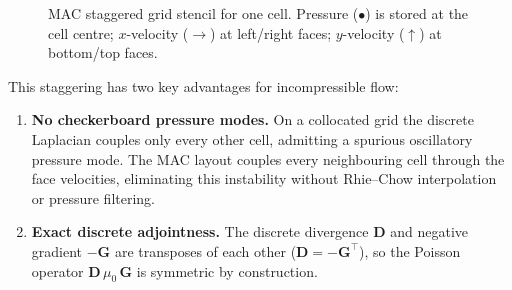 \documentclass[11pt]{article}
\newcommand{\vect}[1]{\bm{#1}}
\begin{document}
\begin{figure}[ht]
\centering
{}
\caption{MAC staggered grid stencil for one cell.
  Pressure (\textcolor{blue!80!black}{$\bullet$}) is stored at the cell
  centre; $x$-velocity (\textcolor{red!80!black}{$\to$}) at left/right
  faces; $y$-velocity (\textcolor{green!50!black}{$\uparrow$}) at
  bottom/top faces.}
\label{fig:mac}
\end{figure}

This staggering has two key advantages for incompressible flow:
\begin{enumerate}
  \item \textbf{No checkerboard pressure modes.}  On a collocated grid
    the discrete Laplacian couples only every other cell, admitting a
    spurious oscillatory pressure mode.  The MAC layout couples every
    neighbouring cell through the face velocities, eliminating this
    instability without Rhie--Chow interpolation or pressure filtering.
  \item \textbf{Exact discrete adjointness.}  The discrete divergence
    $\vect{D}$ and negative gradient $-\vect{G}$ are transposes of each
    other ($\vect{D} = -\vect{G}^{\top}$), so the Poisson operator
    $\vect{D}\,\mu_0\,\vect{G}$ is symmetric by construction.
\end{enumerate}
\end{document}
